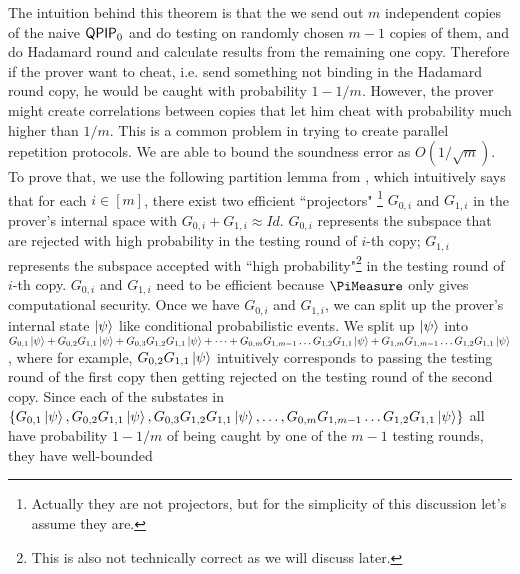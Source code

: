 The intuition behind this theorem is that the we send out $m$ independent copies of the naive $\operatorname{\mathsf{QPIP}}_0$ and do testing on randomly chosen $m-1$ copies of them, and do Hadamard round and calculate results from the remaining one copy. Therefore if the prover want to cheat, i.e. send something not binding in the Hadamard round copy, he would be caught with probability $1-1/m$. However, the prover might create correlations between copies that let him cheat with probability much higher than $1/m$. This is a common problem in trying to create parallel repetition protocols. We are able to bound the soundness error as $O(1/\sqrt{m})$. To prove that, we use the following partition lemma from \cite{arXiv:ChiaChungYam19}, which intuitively says that for each $i\in[m]$, there exist two efficient ``projectors" \footnote{Actually they are not projectors, but for the simplicity of this discussion let's assume they are.} $G_{0,i}$ and $G_{1,i}$ in the prover's internal space with $G_{0,i}+G_{1,i} \approx Id$.  $G_{0,i}$ represents the subspace that are rejected with high probability in the testing round of $i$-th copy; $G_{1,i}$  represents the subspace accepted with ``high probability"\footnote{This is also not technically correct as we will discuss later.} in the testing round of $i$-th copy.  $G_{0,i}$ and $G_{1,i}$ need to be efficient because $\PiMeasure$ only gives computational security. Once we have $G_{0,i}$ and $G_{1,i}$, we can split up the prover's internal state $\ket{\psi}$ like conditional probabilistic events.  We  split up  $\ket{\psi}$ into $G_{0,1}\ket{\psi}+ G_{0,2}G_{1,1}\ket{\psi} + G_{0,3}G_{1,2}G_{1,1}\ket{\psi} + \dots +  G_{0,m} G_{1,m-1}\dots G_{1,2}G_{1,1}\ket{\psi} + G_{1,m} G_{1,m-1}\dots G_{1,2}G_{1,1}\ket{\psi}$, where for example, $G_{0,2}G_{1,1}\ket{\psi}$ intuitively corresponds to passing the testing round of the first copy then getting rejected on the testing round of the second copy. Since each of the  substates in  $\{G_{0,1}\ket{\psi}, G_{0,2}G_{1,1}\ket{\psi} , G_{0,3}G_{1,2}G_{1,1}\ket{\psi} , \dots ,  G_{0,m} G_{1,m-1}\dots G_{1,2}G_{1,1}\ket{\psi} \}$ all have  probability $1-1/m$ of being caught by one of the $m-1$ testing rounds, they have well-bounded 
